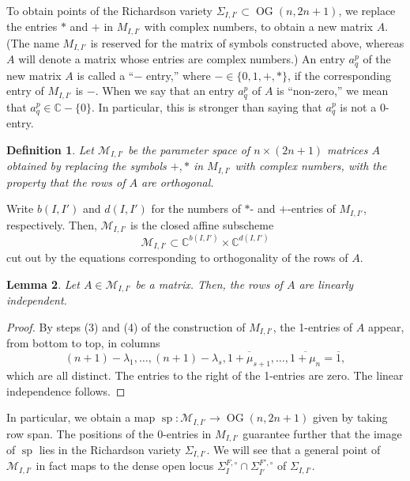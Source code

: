 \documentclass[12pt]{amsart}
\newtheorem{definition}{Definition}[subsection]
\newtheorem{lemma}[definition]{Lemma}
\DeclareMathOperator{\OG}{OG}
\DeclareMathOperator{\ssp}{sp}
\newcommand{\bC}{\mathbb{C}}
\newcommand{\cM}{\mathcal{M}}
\begin{document}
To obtain points of the Richardson variety $\Sigma_{I,I'}\subset\OG(n,2n+1)$, we replace the entries $*$ and $+$ in $M_{I,I'}$ with complex numbers, to obtain a new matrix $A$. (The name $M_{I,I'}$ is reserved for the matrix of symbols constructed above, whereas $A$ will denote a matrix whose entries are complex numbers.) An entry $a^p_q$ of the new matrix $A$ is called a ``$-$ entry,'' where $-\in\{0,1,+,*\}$, if the corresponding entry of $M_{I,I'}$ is $-$. When we say that an entry $a^p_q$ of $A$ is ``non-zero,'' we mean that $a^p_q\in\bC-\{0\}$. In particular, this is stronger than saying that $a^p_q$ is not a 0-entry.

\begin{definition}
    Let $\cM_{I,I'}$ be the parameter space of $n\times (2n+1)$ matrices $A$ obtained by replacing the symbols $+,*$ in $M_{I,I'}$ with complex numbers, with the property that the rows of $A$ are orthogonal.
\end{definition}

Write $b(I,I')$ and $d(I,I')$ for the numbers of $*$- and $+$-entries of $M_{I,I'}$, respectively. Then, $\cM_{I,I'}$ is the closed affine subscheme
    \begin{equation*}
    \cM_{I,I'}\subset \bC^{b(I,I')}\times \bC^{d(I,I')}
    \end{equation*}
cut out by the equations corresponding to orthogonality of the rows of $A$.

\begin{lemma}\label{lem:AII'}
Let $A\in\cM_{I,I'}$ be a matrix. Then, the rows of $A$ are linearly independent.
\end{lemma}

\begin{proof}
    By steps (3) and (4) of the construction of $M_{I,I'}$, the 1-entries of $A$ appear, from bottom to top, in columns
    \begin{equation*}
    (n+1)-\lambda_1,\ldots,(n+1)-\lambda_s,\overline{1+\mu_{s+1}},\ldots,\overline{1+\mu_n}=\overline{1},
    \end{equation*}
    which are all distinct. The entries to the right of the 1-entries are zero. The linear independence follows.
\end{proof}
    
In particular, we obtain a map $\ssp:\cM_{I,I'}\to \OG(n,2n+1)$ given by taking row span. The positions of the 0-entries in $M_{I,I'}$ guarantee further that the image of $\ssp$ lies in the Richardson variety $\Sigma_{I,I'}$. We will see that a general point of $\cM_{I,I'}$ in fact maps to the dense open locus $\Sigma_I^{F,\circ}\cap \Sigma_{I'}^{F',\circ}$ of $\Sigma_{I,I'}$.
\end{document}
